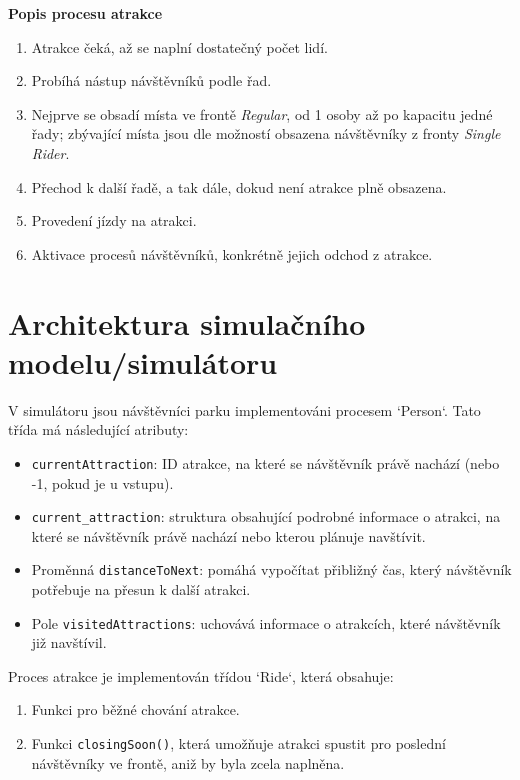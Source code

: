 \documentclass[a4paper,12pt]{article}
\begin{document}
\textbf{Popis procesu atrakce}
\begin{enumerate}[label=\textbf{\arabic*.}]
    \item Atrakce čeká, až se naplní dostatečný počet lidí.
    \item Probíhá nástup návštěvníků podle řad.
    \item Nejprve se obsadí místa ve frontě \textit{Regular}, od 1 osoby až po kapacitu jedné řady; zbývající místa jsou dle možností obsazena návštěvníky z fronty \textit{Single Rider}.
    \item Přechod k další řadě, a tak dále, dokud není atrakce plně obsazena.
    \item Provedení jízdy na atrakci.
    \item Aktivace procesů návštěvníků, konkrétně jejich odchod z atrakce.
\end{enumerate}

\section{Architektura simulačního modelu/simulátoru}
V simulátoru jsou návštěvníci parku implementováni procesem `Person`. Tato třída má následující atributy:  

\begin{itemize}
    \item \texttt{currentAttraction}: ID atrakce, na které se návštěvník právě nachází (nebo -1, pokud je u vstupu).  
    \item \texttt{current\_attraction}: struktura obsahující podrobné informace o atrakci, na které se návštěvník právě nachází nebo kterou plánuje navštívit.  
    \item Proměnná \texttt{distanceToNext}: pomáhá vypočítat přibližný čas, který návštěvník potřebuje na přesun k další atrakci.  
    \item Pole \texttt{visitedAttractions}: uchovává informace o atrakcích, které návštěvník již navštívil.  
\end{itemize}

Proces atrakce je implementován třídou `Ride`, která obsahuje:  

\begin{enumerate}
    \item Funkci pro běžné chování atrakce.  
    \item Funkci \texttt{closingSoon()}, která umožňuje atrakci spustit pro poslední návštěvníky ve frontě, aniž by byla zcela naplněna.  
\end{enumerate} 
\end{document}
